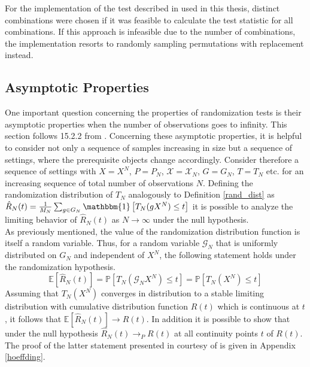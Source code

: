 \documentclass[12pt, a4paper]{article}
\theoremstyle{MAstyle} \newtheorem{assumption}{Assumption}[section]
\theoremstyle{MAstyle} \newtheorem{definition}{Definition}[section]
\theoremstyle{MAstyle} \newtheorem{theorem}{Theorem}[section]
\begin{document}
			For the implementation of the test described in \cite{bugni_permutation_2021} used in this thesis, distinct combinations were chosen if it was feasible to calculate the test statistic for all combinations. If this approach is infeasible due to the number of combinations, the implementation resorts to randomly sampling permutations with replacement instead.
		
		\subsection{Asymptotic Properties}\label{perm_asymp}
			One important question concerning the properties of randomization tests is their asymptotic properties when the number of observations goes to infinity. This section follows 15.2.2 from \cite{lehmann_testing_2005}. Concerning these asymptotic properties, it is helpful to consider not only a sequence of samples increasing in size but a sequence of settings, where the prerequisite objects change accordingly. Consider therefore a sequence of settings with $X = X^N$, $P = P_N$, $\mathcal{X} = \mathcal{X}_N$, $G = G_N$, $T = T_N$ etc. for an increasing sequence of total number of observations $N$.
			Defining the randomization distribution of $T_N$ analogously to Definition \ref{rand_dist} as $\hat{R}_N(t) = \frac{1}{M_N} \sum_{g \in G_N} \mathbbm{1} \left[T_N(gX^N) \leq t\right]$ it is possible to analyze the limiting behavior of $\hat{R}_N(t)$ as $N \rightarrow \infty$ under the null hypothesis.\\
			As previously mentioned, the value of the randomization distribution function is itself a random variable. Thus, for a random variable $\mathcal{G}_N$ that is uniformly distributed on $G_N$ and independent of $X^N$, the following statement holds under the randomization hypothesis.
			\begin{equation}
				\mathbb{E}[\hat{R}_N(t)] = \mathbb{P}\left[T_N(\mathcal{G}_NX^N) \leq t\right] = \mathbb{P}\left[T_N(X^N) \leq t\right]
			\end{equation}
			Assuming that $T_N(X^N)$ converges in distribution to a stable limiting distribution with cumulative distribution function $R(t)$ which is continuous at $t$, it follows that $\mathbb{E}[\hat{R}_N(t)] \rightarrow R(t)$. In addition it is possible to show that under the null hypothesis $\hat{R}_N(t) \rightarrow_P R(t)$ at all continuity points $t$ of $R(t)$. The proof of the latter statement presented in \cite{lehmann_testing_2005} courtesy of \cite{hoeffding_large-sample_1952} is given in Appendix \ref{hoeffding}.\\
			
\end{document}
